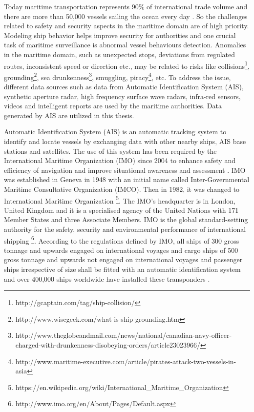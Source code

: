 \documentclass[12pt,glossary]{dalcsthesis}
\begin{document}
Today maritime transportation represents 90\% of international trade volume \cite{vespe12} and there are more than 50,000 vessels sailing the ocean every day \cite{Nicolas}. So the challenges related to safety and security aspects in the maritime domain are of high priority. 
Modeling ship behavior helps improve security for authorities and one crucial task of maritime surveillance is abnormal vessel behaviours detection.
Anomalies in the maritime domain, such as unexpected stops, deviations from regulated routes, inconsistent speed or direction etc., may be related to risks like collisions\footnote{http://gcaptain.com/tag/ship-collision/}, grounding\footnote{http://www.wisegeek.com/what-is-ship-grounding.htm}, sea drunkenness\footnote{http://www.theglobeandmail.com/news/national/canadian-navy-officer-charged-with-drunkenness-disobeying-orders/article23023966/},  smuggling, piracy\footnote{http://www.maritime-executive.com/article/pirates-attack-two-vessels-in-asia}, etc. To address the issue, different data sources such as data from Automatic Identification System (AIS), synthetic aperture radar, high frequency surface wave radars, infra-red sensors, videos and intelligent reports \cite{masterthesis} are used by the maritime authorities.   Data generated by AIS are utilized in this thesis. 

Automatic Identification System (AIS) is an automatic tracking system to identify and locate vessels by exchanging data with other nearby ships, AIS base stations and satellites. The use of this system has been required by the International Maritime Organization (IMO) since 2004 to enhance safety and efficiency of navigation and improve situational awareness and assessment \cite{AISHarati}. IMO was established in Geneva in 1948 with an initial name called Inter-Governmental Maritime Consultative Organization (IMCO). Then in 1982, it was changed to International Maritime Organization \footnote{https://en.wikipedia.org/wiki/International\_Maritime\_Organization}. The IMO's headquarter is in London, United Kingdom and it is a specialised agency of the United Nations with 171 Member States and three Associate Members. IMO is the global standard-setting authority for the safety, security and environmental performance of international shipping \footnote{http://www.imo.org/en/About/Pages/Default.aspx}.
According to the regulations defined by IMO, all ships of 300 gross tonnage and upwards engaged on international voyages and cargo ships of 500 gross tonnage and upwards not engaged on international voyages and passenger ships irrespective of size shall be fitted with an automatic identification system and over 400,000 ships worldwide have installed these transponders \cite{AISdummies}. 
\end{document}
